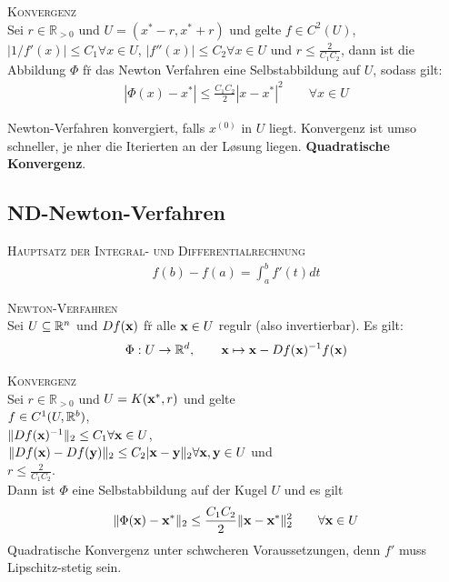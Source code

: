 \textsc{Konvergenz}\\
Sei $r\in \mathbb{R}_{>0}$ und $U=(x^*-r, x^*+r)$ und gelte $f\in C^2(U)$, $|1/f'(x)|\leq C_1 \forall x\in U$, $|f''(x)| \leq C_2 \forall x\in U$ und $r \leq \frac{2}{C_1C_2}$, dann ist die Abbildung $\Phi$ f\u r das Newton Verfahren eine Selbstabbildung auf $U$, sodass gilt:
\begin{align*}
|\Phi(x) - x^* | \leq \frac{C_1C_2}{2}|x-x^*|^2 \qquad \forall x\in U
\end{align*}

Newton-Verfahren konvergiert, falls $x^{(0)}$ in $U$ liegt. Konvergenz ist umso schneller, je n\a her die Iterierten an der L\o sung liegen. \textbf{Quadratische Konvergenz}.

\subsection{ND-Newton-Verfahren}
\textsc{Hauptsatz der Integral- und Differentialrechnung}\\
\begin{align*}
f(b)-f(a) = \int_a^b f'(t) dt
\end{align*}\vspace{0.2cm}

\textsc{Newton-Verfahren}\\
Sei $U \subseteq \mathbb{R}^{n}$ und $Df(\mbox{\bf x})$ f\u r alle $\mbox{\bf x} \in U$ regul\a r (also invertierbar). Es gilt:
\begin{align*}
\Phi : U \rightarrow \mathbb{R}^{d}, \qquad \mbox{\bf x} \mapsto \mbox{\bf x} - Df(\mbox{\bf x})^{-1}f(\mbox{\bf x})
\end{align*}\vspace{0.2cm}

\textsc{Konvergenz}\\
Sei $r\in \mathbb{R}_{>0}$ und $U= K(\mbox{\bf x}^*,r)$ und gelte \\
$f\in C^1(U,\mathbb{R}^{b})$,\\
 $\Vert Df(\mbox{\bf x})^{-1}\Vert_2 \leq C_1 \forall \mbox{\bf x} \in U$,\\
$\Vert Df(\mbox{\bf x}) - Df(\mbox{\bf y})\Vert_2 \leq C_2 \vert \mbox{\bf x} - \mbox{\bf y} \Vert_2 \forall \mbox{\bf x}, \mbox{\bf y} \in U$ und \\
$r\leq \frac{2}{C_1C_2}$.\\
Dann ist $\Phi$ eine Selbstabbildung auf der Kugel $U$ und es gilt
\begin{align*}
\Vert \Phi(\mbox{\bf x}) - \mbox{\bf x}^*\Vert_2 \leq \frac{C_1C_2}{2}\Vert \mbox{\bf x} - \mbox{\bf x}^* \Vert_2^2 \qquad \forall \mbox{\bf x}\in U
\end{align*}
Quadratische Konvergenz unter schw\a cheren Voraussetzungen, denn $f'$ muss Lipschitz-stetig sein.\vspace{0.2cm}

